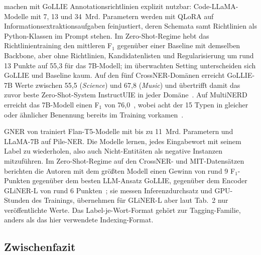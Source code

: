 \textcite{sainz2024gollie} machen mit GoLLIE Annotationsrichtlinien
explizit nutzbar: Code-LLaMA-Modelle mit 7, 13 und 34~Mrd. Parametern
werden mit QLoRA auf Informationsextraktionsaufgaben feinjustiert, deren
Schemata samt Richtlinien als Python-Klassen im Prompt stehen.
Im Zero-Shot-Regime hebt das Richtlinientraining den mittleren F$_1$
gegenüber einer Baseline mit demselben Backbone, aber ohne Richtlinien,
Kandidatenlisten und Regularisierung um rund 13 Punkte auf 55{,}3 für
das 7B-Modell; im überwachten Setting unterscheiden sich
GoLLIE und Baseline kaum.
Auf den fünf CrossNER-Domänen erreicht GoLLIE-7B Werte zwischen 55{,}5
(\emph{Science}) und 67{,}8 (\emph{Music}) und übertrifft damit das
zuvor beste Zero-Shot-System InstructUIE in jeder
Domäne~\cite[Tab.~3]{sainz2024gollie}.
Auf MultiNERD erreicht das 7B-Modell einen F$_1$ von
76{,}0~\cite[Tab.~3]{sainz2024gollie},
wobei acht der 15 Typen in gleicher oder ähnlicher Benennung bereits im Training
vorkamen~\cite[Anh.~B, Tab.~6]{sainz2024gollie}.


GNER von \textcite{ding2024gner} trainiert Flan-T5-Modelle mit bis zu
11~Mrd. Parametern und LLaMA-7B auf Pile-NER.
Die Modelle lernen, jedes Eingabewort mit seinem Label zu wiederholen,
also auch Nicht-Entitäten als negative Instanzen mitzuführen.
Im Zero-Shot-Regime auf den CrossNER- und MIT-Datensätzen berichten die
Autoren mit dem größten Modell einen Gewinn von rund 9 F$_1$-Punkten
gegenüber dem besten LLM-Ansatz GoLLIE, gegenüber dem Encoder GLiNER-L
von rund 6 Punkten~\cite[Tab.~2]{ding2024gner}; sie messen
Inferenzdurchsatz und GPU-Stunden des Trainings, übernehmen für GLiNER-L
aber laut Tab.~2 nur veröffentlichte Werte.
Das Label-je-Wort-Format gehört zur Tagging-Familie, anders als das hier
verwendete Indexing-Format.

\subsection{Zwischenfazit}
\label{sec:k3-zwischenfazit}

